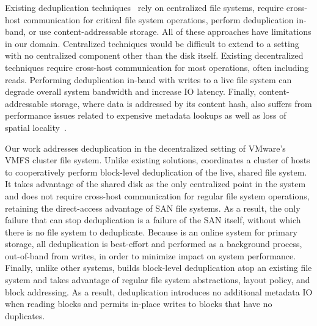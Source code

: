 Existing deduplication techniques~\cite{bolosky00sis, douceur02farsitededup, 
  hydrastor-fast09, centeradatasheet, hong04sandedup,
  netapp-asis-website, quinlan02venti, rhea-foundation,
  zhu08datadomain}
rely on centralized file systems, require cross-host communication for
critical file system operations, perform
deduplication in-band, or use content-addressable storage.
All of these approaches have limitations in our domain.
Centralized techniques would be difficult to extend to a setting with
no centralized component other than the disk itself.  Existing
decentralized techniques require cross-host communication for most
operations, often including reads.  Performing
deduplication in-band with writes to a live file system can degrade
overall system bandwidth and increase IO latency.  Finally,
content-addressable storage, where
data is addressed by its content hash, also suffers from performance
issues related to expensive metadata lookups as well as loss of
spatial locality~\cite{cas-experiences}.


Our work addresses deduplication in the decentralized setting of
VMware's VMFS cluster file system.  Unlike existing solutions, \DeDe
coordinates a cluster of hosts to cooperatively perform block-level
deduplication of the live, shared file system.  It takes advantage of
the shared disk as the only centralized point in the system and does not
require cross-host communication for regular file system operations,
retaining the direct-access advantage of SAN file systems.  As a
result, the only failure that can stop deduplication is a failure of
the SAN itself, without which there is no file system to deduplicate.
Because \DeDe is an online system for primary storage, all
deduplication is best-effort and performed as a background process,
out-of-band from writes, in order to minimize impact on system
performance.  Finally, unlike other systems, \DeDe builds block-level
deduplication atop an existing file system and takes advantage of
regular file system abstractions, layout policy, and block addressing.
As a result, deduplication introduces no additional metadata IO when
reading blocks and permits in-place writes to blocks that have no
duplicates.

